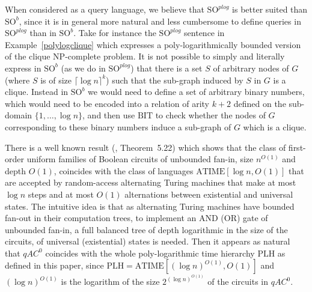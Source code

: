 \documentclass{article}
\begin{document}
When considered as a query language, we believe that $\mathrm{SO}^{\mathit{plog}}$ is better suited than $\mathrm{SO}^b$, since it is in general more natural and less cumbersome to define queries in $\mathrm{SO}^{\mathit{plog}}$ than in $\mathrm{SO}^b$. Take for instance the $\mathrm{SO}^{\mathit{plog}}$ sentence in Example~\ref{polylogclique} which expresses a poly-logarithmically bounded version of the clique NP-complete problem. It is not possible to simply and literally express in $\mathrm{SO}^b$ (as we do in $\mathrm{SO}^{\mathit{plog}}$) that there is a set $S$ of arbitrary nodes of $G$ (where $S$ is of size $\lceil \log n\rceil^k$) such that the sub-graph induced by $S$ in $G$ is a clique. Instead in $\mathrm{SO}^b$ we would need to define a set of arbitrary binary numbers, which would need to be encoded into a relation of arity $k+2$ defined on the sub-domain $\{1, \ldots, \log n\}$, and then use $\mathrm{BIT}$ to check whether the nodes of $G$ corresponding to these binary numbers induce a sub-graph of $G$ which is a clique.      



There is a well known result (\cite{Immerman99}, Theorem~5.22) which shows that the class of first-order uniform families of Boolean circuits of unbounded fan-in, size $n^{{O}(1)}$ and depth ${O}(1)$, coincides with the class of languages $\mathrm{ATIME}[\log n, {O}(1)]$ that are accepted by random-access alternating Turing machines that make at most $\log n$ steps and at most ${O}(1)$ alternations between existential and universal states. The intuitive idea is that as alternating Turing machines have bounded fan-out in their computation trees, to implement an AND (OR) gate of unbounded fan-in, a full balanced tree of depth logarithmic in the size of the circuits, of universal (existential) states is needed. Then it appears as natural that $qAC^0$ coincides with the whole poly-logarithmic time hierarchy $\mathrm{PLH}$ as defined in this paper, since $\mathrm{PLH} = \mathrm{ATIME}[(\log n)^{{O}(1)}, {O}(1)]$ and $(\log n)^{{O}(1)}$ is the logarithm of the size $2^{(\log n)^{{O}(1)}}$ of the circuits in $qAC^0$.   
\end{document}
